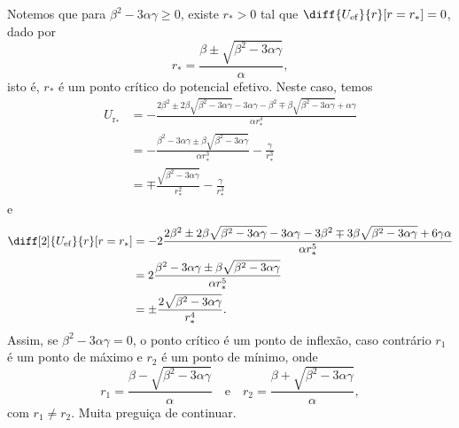 Notemos que para \(\beta^2 - 3 \alpha \gamma \geq 0\), existe \(r_*>0\) tal que \(\diff{U_\mathrm{ef}}{r}[r=r_*] = 0\), dado por
\begin{equation*}
    r_*= \frac{\beta \pm \sqrt{\beta^2 - 3 \alpha \gamma}}{\alpha},
\end{equation*}
isto é, \(r_*\) é um ponto crítico do potencial efetivo. Neste caso, temos
\begin{align*}
    U_\mathrm{r_*} &= -\frac{2\beta^2 \pm 2 \beta \sqrt{\beta^2 - 3 \alpha \gamma} - 3 \alpha \gamma -\beta^2 \mp \beta\sqrt{\beta^2 - 3 \alpha \gamma} +\alpha \gamma}{\alpha r_*^3}\\
                   &= - \frac{\beta^2 - 3 \alpha \gamma \pm \beta\sqrt{\beta^2 - 3 \alpha \gamma}}{\alpha r_*^3} - \frac{\gamma}{r_*^3}\\
                   &= \mp\frac{\sqrt{\beta^2 - 3 \alpha \gamma}}{r_*^2} - \frac{\gamma}{r_*^3}
\end{align*}
e
\begin{align*}
    \diff[2]{U_\mathrm{ef}}{r}[r=r_*] &= -2 \frac{2\beta^2 \pm 2 \beta \sqrt{\beta^2 - 3 \alpha \gamma} - 3 \alpha \gamma - 3 \beta^2 \mp 3 \beta \sqrt{\beta^2 - 3 \alpha \gamma} + 6 \gamma \alpha}{\alpha r_*^5}\\
                                      &= 2\frac{\beta^2 - 3 \alpha \gamma \pm \beta \sqrt{\beta^2 - 3 \alpha \gamma} }{\alpha r_*^5}\\
                                      &= \pm\frac{2\sqrt{\beta^2 - 3 \alpha \gamma}}{r_*^4}.
\end{align*}
Assim, se \(\beta^2 - 3 \alpha \gamma = 0\), o ponto crítico é um ponto de inflexão, caso contrário \(r_1\) é um ponto de máximo e \(r_2\) é um ponto de mínimo, onde
\begin{equation*}
    r_1 =\frac{\beta - \sqrt{\beta^2 - 3 \alpha \gamma}}{\alpha}\quad\text{e}\quad r_2 =\frac{\beta + \sqrt{\beta^2 - 3 \alpha \gamma}}{\alpha},
\end{equation*}
com \(r_1 \neq r_2\). Muita preguiça de continuar.
